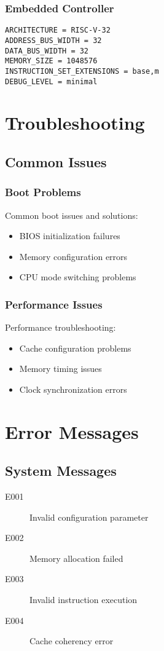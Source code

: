 \documentclass[a4paper,11pt]{book}
\begin{document}
\subsection{Embedded Controller}
\begin{lstlisting}[style=fxmlstyle]
ARCHITECTURE = RISC-V-32
ADDRESS_BUS_WIDTH = 32
DATA_BUS_WIDTH = 32
MEMORY_SIZE = 1048576
INSTRUCTION_SET_EXTENSIONS = base,m
DEBUG_LEVEL = minimal
\end{lstlisting}

\chapter{Troubleshooting}
\section{Common Issues}
\subsection{Boot Problems}
Common boot issues and solutions:
\begin{itemize}
    \item BIOS initialization failures
    \item Memory configuration errors
    \item CPU mode switching problems
\end{itemize}

\subsection{Performance Issues}
Performance troubleshooting:
\begin{itemize}
    \item Cache configuration problems
    \item Memory timing issues
    \item Clock synchronization errors
\end{itemize}

\appendix
\chapter{Error Messages}
\section{System Messages}
\begin{description}
    \item[E001] Invalid configuration parameter
    \item[E002] Memory allocation failed
    \item[E003] Invalid instruction execution
    \item[E004] Cache coherency error
\end{description}
\end{document}
